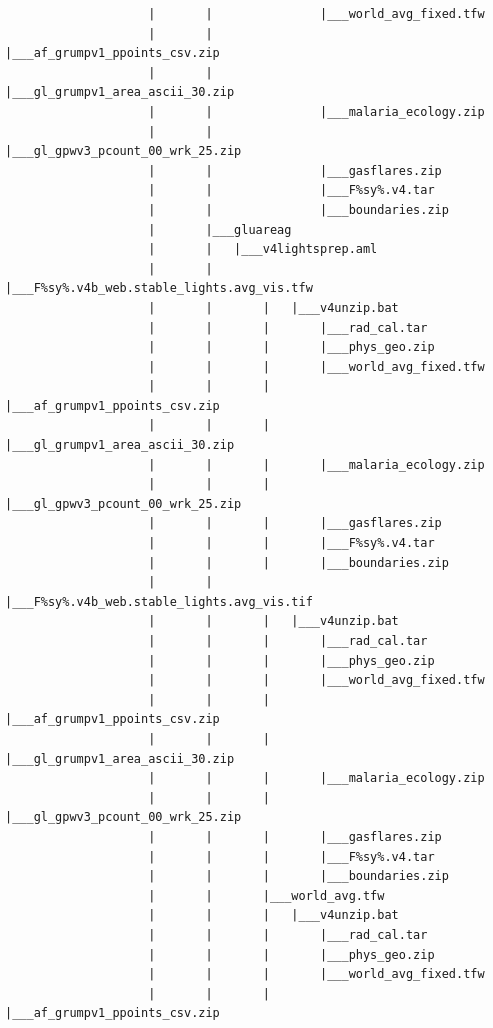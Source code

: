 \documentclass[]{book}
\begin{document}
\begin{verbatim}
                    |       |               |___world_avg_fixed.tfw
                    |       |               |___af_grumpv1_ppoints_csv.zip
                    |       |               |___gl_grumpv1_area_ascii_30.zip
                    |       |               |___malaria_ecology.zip
                    |       |               |___gl_gpwv3_pcount_00_wrk_25.zip
                    |       |               |___gasflares.zip
                    |       |               |___F%sy%.v4.tar
                    |       |               |___boundaries.zip
                    |       |___gluareag
                    |       |   |___v4lightsprep.aml
                    |       |       |___F%sy%.v4b_web.stable_lights.avg_vis.tfw
                    |       |       |   |___v4unzip.bat
                    |       |       |       |___rad_cal.tar
                    |       |       |       |___phys_geo.zip
                    |       |       |       |___world_avg_fixed.tfw
                    |       |       |       |___af_grumpv1_ppoints_csv.zip
                    |       |       |       |___gl_grumpv1_area_ascii_30.zip
                    |       |       |       |___malaria_ecology.zip
                    |       |       |       |___gl_gpwv3_pcount_00_wrk_25.zip
                    |       |       |       |___gasflares.zip
                    |       |       |       |___F%sy%.v4.tar
                    |       |       |       |___boundaries.zip
                    |       |       |___F%sy%.v4b_web.stable_lights.avg_vis.tif
                    |       |       |   |___v4unzip.bat
                    |       |       |       |___rad_cal.tar
                    |       |       |       |___phys_geo.zip
                    |       |       |       |___world_avg_fixed.tfw
                    |       |       |       |___af_grumpv1_ppoints_csv.zip
                    |       |       |       |___gl_grumpv1_area_ascii_30.zip
                    |       |       |       |___malaria_ecology.zip
                    |       |       |       |___gl_gpwv3_pcount_00_wrk_25.zip
                    |       |       |       |___gasflares.zip
                    |       |       |       |___F%sy%.v4.tar
                    |       |       |       |___boundaries.zip
                    |       |       |___world_avg.tfw
                    |       |       |   |___v4unzip.bat
                    |       |       |       |___rad_cal.tar
                    |       |       |       |___phys_geo.zip
                    |       |       |       |___world_avg_fixed.tfw
                    |       |       |       |___af_grumpv1_ppoints_csv.zip

\end{verbatim}
\end{document}
